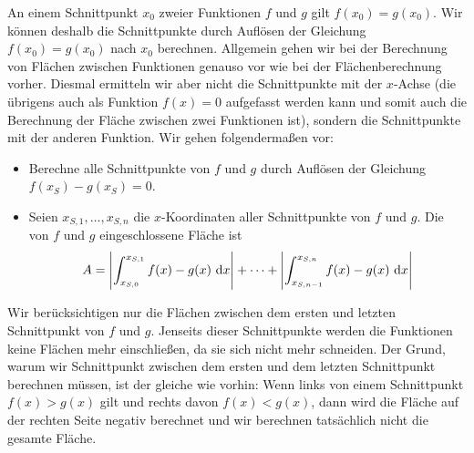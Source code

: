\documentclass[../../main.tex]{subfiles}
\begin{document}
An einem Schnittpunkt $x_0$ zweier Funktionen $f$ und $g$ gilt $f(x_0)=g(x_0)$. Wir können deshalb die Schnittpunkte durch Auflösen der Gleichung $f(x_0)=g(x_0)$ nach $x_0$ berechnen. Allgemein gehen wir bei der Berechnung von Flächen zwischen Funktionen genauso vor wie bei der Flächenberechnung vorher. Diesmal ermitteln wir aber nicht die Schnittpunkte mit der $x$-Achse (die übrigens auch als Funktion $f(x)=0$ aufgefasst werden kann und somit auch die Berechnung der Fläche zwischen zwei Funktionen ist), sondern die Schnittpunkte mit der anderen Funktion. Wir gehen folgendermaßen vor:
\begin{itemize}
    \item Berechne alle Schnittpunkte von $f$ und $g$ durch Auflösen der Gleichung $f(x_S)-g(x_S)=0$.
    \item Seien $x_{S,1},\dots,x_{S,n}$ die $x$-Koordinaten aller Schnittpunkte von $f$ und $g$. Die von $f$ und $g$ eingeschlossene Fläche ist \[A=\Biggl|\int_{x_{S,0}}^{x_{S,1}} f(x)-g(x)\mathop{}\mathrm{d} x\Biggr|+\dots+\Biggl|\int_{x_{S,n-1}}^{x_{S,n}} f(x)-g(x)\mathop{}\mathrm{d} x\Biggr|\]
\end{itemize}

Wir berücksichtigen nur die Flächen zwischen dem ersten und letzten Schnittpunkt von $f$ und $g$. Jenseits dieser Schnittpunkte werden die Funktionen keine Flächen mehr einschließen, da sie sich nicht mehr schneiden. Der Grund, warum wir Schnittpunkt zwischen dem ersten und dem letzten Schnittpunkt berechnen müssen, ist der gleiche wie vorhin: Wenn links von einem Schnittpunkt $f(x)>g(x)$ gilt und rechts davon $f(x)<g(x)$, dann wird die Fläche auf der rechten Seite negativ berechnet und wir berechnen tatsächlich nicht die gesamte Fläche.
\begin{center}
\end{center}
\end{document}
